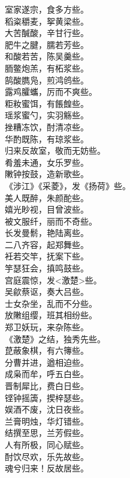 \documentclass[]{article}
\begin{document}
室家遂宗，食多方些。\\
稻粢穱麦，挐黄梁些。\\
大苦醎酸，辛甘行些。\\
肥牛之腱，臑若芳些。\\
和酸若苦，陈吴羹些。\\
胹鳖炮羔，有柘浆些。\\
鹄酸臇凫，煎鸿鸧些。\\
露鸡臛蠵，厉而不爽些。\\
粔籹蜜饵，有餦餭些。\\
瑶浆蜜勺，实羽觞些。\\
挫糟冻饮，酎清凉些。\\
华酌既陈，有琼浆些。\\
归来反故室，敬而无妨些。\\
肴羞未通，女乐罗些。\\
敶钟按鼓，造新歌些。\\
《涉江》《采菱》，发《扬荷》些。\\
美人既醉，朱颜酡些。\\
嬉光眇视，目曾波些。\\
被文服纤，丽而不奇些。\\
长发曼鬋，艳陆离些。\\
二八齐容，起郑舞些。\\
衽若交竿，抚案下些。\\
竽瑟狂会，搷鸣鼓些。\\
宫庭震惊，发\textless{}激楚\textgreater{}些。\\
吴歈蔡讴，奏大吕些。\\
士女杂坐，乱而不分些。\\
放敶组缨，班其相纷些。\\
郑卫妖玩，来杂陈些。\\
《激楚》之结，独秀先些。\\
菎蔽象棋，有六簙些。\\
分曹并进，遒相迫些。\\
成枭而牟，呼五白些。\\
晋制犀比，费白日些。\\
铿钟摇簴，揳梓瑟些。\\
娱酒不废，沈日夜些。\\
兰膏明烛，华灯错些。\\
结撰至思，兰芳假些。\\
人有所极，同心赋些。\\
酎饮尽欢，乐先故些。\\
魂兮归来！反故居些。
\end{document}
